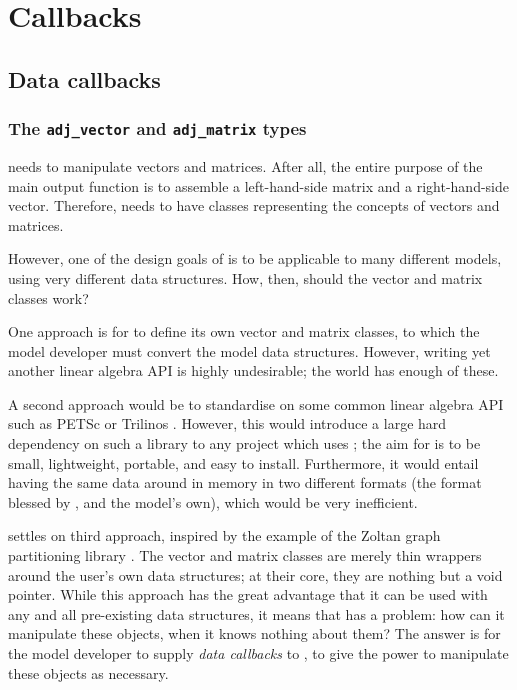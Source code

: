 \chapter{Callbacks} \label{chap:callbacks}

\begin{synopsis}
\end{synopsis}
\minitoc
\vspace{\fill}
\newpage

\section{Data callbacks}
\subsection{The \texttt{adj_vector} and \texttt{adj_matrix} types}
\libadjoint needs to manipulate vectors and matrices. After all, the entire
purpose of the main output function  is to
assemble a left-hand-side matrix and a right-hand-side vector. Therefore,
\libadjoint needs to have classes representing the concepts of vectors and matrices.

However, one of the
design goals of \libadjoint is to be applicable to many different models,
using very different data structures. How, then, should the \libadjoint
vector and matrix classes work?

One approach is for \libadjoint to define its own vector and matrix classes,
to which the model developer must convert the model data structures. However,
writing yet another linear algebra API is highly undesirable; the world
has enough of these.

A second approach would be to standardise on some common linear algebra
API such as PETSc \citep{balay1997,balay2010} or Trilinos \citep{heroux2003}. However,
this would introduce a large hard dependency on such a library to any project which uses \libadjoint;
the aim for \libadjoint is to be small, lightweight, portable, and easy to install. Furthermore,
it would entail having the same data around in memory in two different formats (the format blessed by \libadjoint,
and the model's own), which would be very inefficient.

\libadjoint settles on third approach, inspired by the example of the Zoltan
graph partitioning library \citep{devine2002}. The \libadjoint vector and matrix
classes are merely thin wrappers around the user's own data structures;
at their core, they are nothing but a void pointer. While this approach has the
great advantage that it can be used with any and all pre-existing data structures,
it means that \libadjoint has a problem: how can it manipulate these objects,
when it knows nothing about them? The answer is for the model developer to supply
\emph{data callbacks} to \libadjoint, to give \libadjoint the power to manipulate
these objects as necessary.

